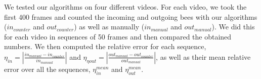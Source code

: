 \documentclass[10pt,twocolumn,letterpaper]{article}
\newcommand{\ra}[1]{\renewcommand{\arraystretch}{#1}}
\begin{document}
We tested our algorithms on four different videos. For each video, we took the first 400 frames and counted the incoming and outgoing bees  with our algorithms ($in_{counter}$ and $out_{counter}$) as well as manually ($in_{manual}$ and $out_{manual}$). We did this for each video in sequences of 50 frames and then compared the obtained numbers. We then computed the relative error for each sequence, $\eta_{in} =|\frac{in_{manual} - in_{counter}}{in_{manual}}|$ and $\eta_{ηout} = |\frac{out_{manual} - out_{counter}}{ out_{manual}}|$, as well as their mean relative error over all the sequences, $\eta_{in}^{mean}$ and $\eta_{out}^{mean}$. 

\end{document}
